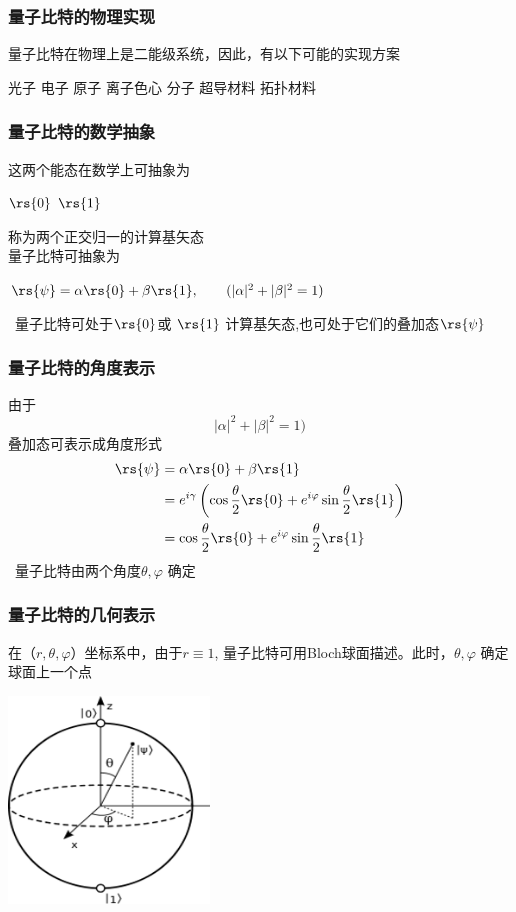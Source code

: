 \begin{frame} 
    \frametitle{量子比特的物理实现}
    量子比特在物理上是二能级系统，因此，有以下可能的实现方案\\
    \begin{enumerate}
        \Item   光子
        \Item   电子
        \Item   原子
        \Item   离子色心
        \Item   分子
        \Item   超导材料
        \Item   拓扑材料
    \end{enumerate}
\end{frame}

\begin{frame} 
    \frametitle{量子比特的数学抽象}   
    这两个能态在数学上可抽象为
    \begin{enumerate}
        \Item   $\rs{0}$
        \Item   $\rs{1}$
    \end{enumerate}
    称为两个正交归一的计算基矢态\\
    量子比特可抽象为
    \begin{enumerate}
        \Item   $\rs{\psi} =\alpha\rs{0}+\beta\rs{1}, \qquad (|\alpha|^2+|\beta|^2=1)$
    \end{enumerate}
    \Note~量子比特可处于$\rs{0}$或 $\rs{1}$ 计算基矢态,也可处于它们的叠加态$\rs{\psi}$
\end{frame}

\begin{frame} 
    \frametitle{量子比特的角度表示} 
  由于\[|\alpha|^2+|\beta|^2=1)\]
  叠加态可表示成角度形式  
  \[\begin{aligned}
    \rs{\psi} &=\alpha\rs{0}+\beta\rs{1} \\
    &=e^{i\gamma} \left(\cos\frac{\theta}{2}\rs{0}+e^{i\varphi} \sin\frac{\theta}{2}\rs{1}\right) \\
    &=\cos\frac{\theta}{2}\rs{0}+e^{i\varphi} \sin\frac{\theta}{2}\rs{1}
  \end{aligned}\]
  \Note~量子比特由两个角度$\theta, \varphi$ 确定
\end{frame}

\begin{frame} 
    \frametitle{量子比特的几何表示} 
  在（$r,\theta,\varphi$）坐标系中，由于$r\equiv 1$, 量子比特可用Bloch球面描述。此时，$\theta, \varphi$ 确定球面上一个点
  \begin{center}
    \includegraphics[width=0.4\textwidth]{figs/8.png}
\end{center} 
\end{frame}

